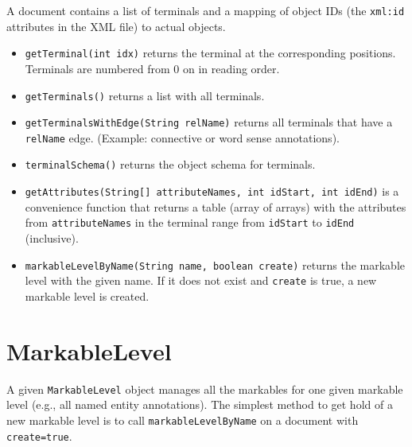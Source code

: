 \documentclass[a4paper,11pt]{report}
\begin{document}
A document contains a list of terminals and a mapping of object IDs (the \texttt{xml:id}
attributes in the XML file) to actual objects.
\begin{itemize}
\item \texttt{getTerminal(int idx)} returns the terminal at the corresponding
positions. Terminals are numbered from 0 on in reading order.
\item \texttt{getTerminals()} returns a list with all terminals.
\item \texttt{getTerminalsWithEdge(String relName)} returns all terminals
that have a \texttt{relName} edge. (Example: connective or word sense annotations).
\item \texttt{terminalSchema()} returns the object schema for terminals.
\item \texttt{getAttributes(String[] attributeNames, int idStart, int idEnd)} is
a convenience function that returns a table (array of arrays) with the attributes from
\texttt{attributeNames} in the terminal range from \texttt{idStart} to \texttt{idEnd} (inclusive).
\item \texttt{markableLevelByName(String name, boolean create)} returns the markable level
with the given name. If it does not exist and \texttt{create} is true, a new markable
level is created.
\end{itemize}

\section{MarkableLevel}
A given \texttt{MarkableLevel} object manages all the markables for one given markable
level (e.g., all named entity annotations). The simplest method to get hold of a new markable
level is to call \texttt{markableLevelByName} on a document with \texttt{create=true}.
\end{document}
